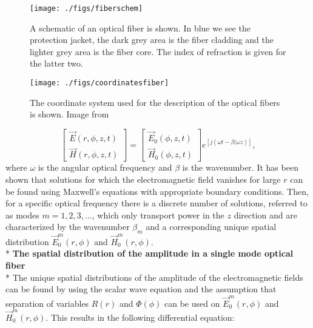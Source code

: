 \begin{figure}[h!]\centering
\texttt{[image: ./figs/fiberschem]}
\caption{A schematic of an optical fiber is shown. In blue we see the protection jacket, the dark grey area is the fiber cladding and the lighter grey area is the fiber core. The index of refraction is given for the latter two.}
\label{fig:fiberschem}
\end{figure}

\begin{figure}[h!]\centering
\texttt{[image: ./figs/coordinatesfiber]}
\caption{The coordinate system used for the description of the optical fibers is shown. Image from \cite{thevenaz2011advanced}}
\label{fig:coordinates}
\end{figure}

\begin{equation}
\left[ \begin{matrix} 
\vec{E}(r,\phi,z,t)  \\
\vec{H}(r,\phi,z,t)  
\end{matrix} \right] = \left[ 
\begin{matrix} 
\vec{E}_0(\phi,z,t)  \\
\vec{H}_0(\phi,z,t)  
\end{matrix} 
\right] e^{\left[j\left(\omega t-\beta(\omega z\right)\right]},
\end{equation} 
where $\omega$ is the angular optical frequency and $\beta$ is the wavenumber. It has been shown that solutions for which the electromagnetic field vanishes for large $r$ can be found using Maxwell's equations with appropriate boundary conditions. Then, for a specific optical frequency there is a discrete number of solutions, referred to as modes $m = 1,2,3,...$, which only transport power in the $z$ direction and are characterized by the wavenumber $\beta_m$ and a corresponding unique spatial distribution $\vec{E}_0^m(r,\phi)$ and $\vec{H}_0^m(r,\phi)$.  
\newline
\\*
{\color{color1}\textbf{The spatial distribution of the amplitude in a single mode optical fiber}}
\\*
\newline
The unique spatial distributions of the amplitude of the electromagnetic fields can be found by using the scalar wave equation and the assumption that separation of variables $R(r)$ and $\Phi(\phi)$ can be used on $\vec{E}_0^m(r,\phi)$  and $\vec{H}_0^m(r,\phi)$. This results in the following differential equation:
